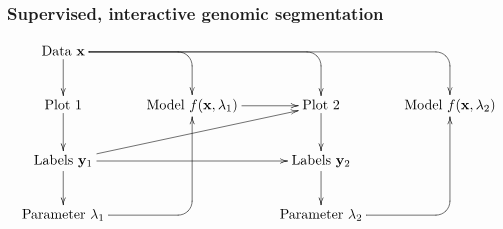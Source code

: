 \documentclass{beamer}
\begin{document}
\begin{frame}
  \frametitle{Supervised, interactive genomic segmentation}
  \small
  \begin{displaymath}
  \xymatrix{
    \text{Data $\mathbf x$}
    \ar `[r] [dr] 
    \ar `r[rr] [drr] 
    \ar `r[rrr] [drrr] 
    \ar [d]
    & \text{ }
    & \text{ }
    & \text{ }
    \\
    \text{Plot 1} 
    \ar [d]
    & 
    \text{Model $f(\mathbf x, \lambda_1)$} 
    \ar [r]
    &
    \text{Plot 2} 
    \ar [d]
    & 
    \text{Model $f(\mathbf x, \lambda_2)$} 
    \\
    \text{Labels $\mathbf y_1$}       
    \ar [d]
    \ar [rr]
    \ar [rru]
    &
    &
    \text{Labels $\mathbf y_2$}
    \ar [d]
    \\
    \text{Parameter $\lambda_1$} 
    \ar `r[ruu] [ruu]
    & \text{ }
    & \text{Parameter $\lambda_2$}
    \ar `r[ruu] [ruu]
  }
  \end{displaymath}
\end{frame}
\end{document}
